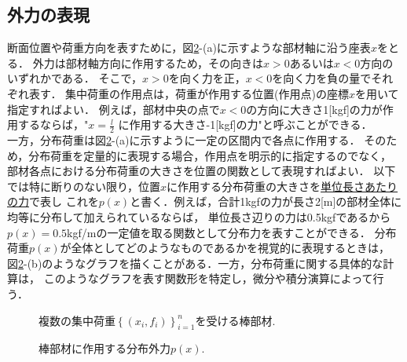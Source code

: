 \documentclass[11pt,a4j]{mybook2}
\begin{document}
\subsection{外力の表現}
\hspace{\parindent}
断面位置や荷重方向を表すために，図\ref{fig:fig0}-(a)に示すような部材軸に沿う座表$x$をとる．
外力は部材軸方向に作用するため，その向きは$x>0$あるいは$x<0$方向のいずれかである．
そこで，$x>0$を向く力を正，$x<0$を向く力を負の量でそれぞれ表す．
集中荷重の作用点は，荷重が作用する位置(作用点)の座標$x$を用いて指定すればよい．
例えば，部材中央の点で$x<0$の方向に大きさ1[kgf]の力が作用するならば，"$x=\frac{l}{2}$
に作用する大きさ-1[kgf]の力"と呼ぶことができる．\\
一方，分布荷重は図\ref{fig:fig0}-(a)に示すように一定の区間内で各点に作用する．
そのため，分布荷重を定量的に表現する場合，作用点を明示的に指定するのでなく，
部材各点における分布荷重の大きさを位置の関数として表現すればよい．
以下では特に断りのない限り，位置$x$に作用する分布荷重の大きさを\underline{単位長さあたりの力}で表し
これを$p(x)$と書く．例えば，合計1kgfの力が長さ2[m]の部材全体に均等に分布して加えられているならば，
単位長さ辺りの力は0.5kgfであるから$p(x)=0.5$kgf/mの一定値を取る関数として分布力を表すことができる．
分布荷重$p(x)$が全体としてどのようなものであるかを視覚的に表現するときは，
図\ref{fig:fig0}-(b)のようなグラフを描くことがある．一方，分布荷重に関する具体的な計算は，
このようなグラフを表す関数形を特定し，微分や積分演算によって行う．
\begin{figure}[h]
	\begin{center}
	\end{center}
	\caption{複数の集中荷重$\left\{(x_i,f_i)\right\}_{i=1}^n$を受ける棒部材.} 
	\label{fig:ploads}
\end{figure}
\begin{figure}[h]
	\begin{center}
	\end{center}
	\caption{棒部材に作用する分布外力$p(x)$.} 
	\label{fig:fig0}
\end{figure}
\end{document}
